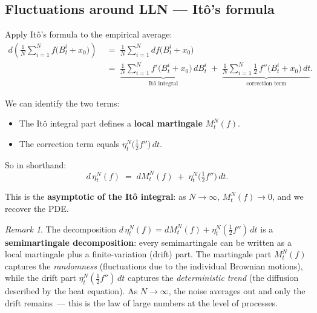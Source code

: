 \documentclass[11pt]{article}
\theoremstyle{definition}
\theoremstyle{remark}
\newtheorem{remark}{Remark}
\begin{document}
\subsection*{Fluctuations around LLN --- Itô's formula}


Apply Itô's formula to the empirical average:
\begin{align*}
    d\!\left(
        \frac{1}{N}\sum_{i=1}^{N}
        f\!\bigl(B_t^i + x_0\bigr)
    \right)
    &\;=\;
    \frac{1}{N}\sum_{i=1}^{N}
    df\!\bigl(B_t^i + x_0\bigr) \\[8pt]
    &\;=\;
    \underbrace{
        \frac{1}{N}\sum_{i=1}^{N}
        f'\!\bigl(B_t^i + x_0\bigr)\,dB_t^i
    }_{\text{Itô integral}}
    \;+\;
    \underbrace{
        \frac{1}{N}\sum_{i=1}^{N}
        \frac{1}{2}\,f''\!\bigl(B_t^i + x_0\bigr)\,dt
    }_{\text{correction term}}.
\end{align*}


We can identify the two terms:
\begin{itemize}
    \item The Itô integral part defines a \textbf{local martingale}
          $M_t^N(f)$.
    \item The correction term equals
          $\eta_t^N\!\bigl(\tfrac{1}{2}f''\bigr)\,dt$.
\end{itemize}

So in shorthand:
\[
    d\,\eta_t^N(f)
    \;=\;
    dM_t^N(f)
    \;+\;
    \eta_t^N\!\bigl(\tfrac{1}{2}f''\bigr)\,dt.
\]


This is the \textbf{asymptotic of the Itô integral}:
as $N \to \infty$, $M_t^N(f) \to 0$, and we recover the PDE.

\begin{remark}
The decomposition $d\,\eta_t^N(f) = dM_t^N(f) + \eta_t^N(\tfrac{1}{2}f'')\,dt$
is a \textbf{semimartingale decomposition}: every semimartingale can
be written as a local martingale plus a finite-variation (drift) part.
The martingale part $M_t^N(f)$ captures the \emph{randomness}
(fluctuations due to the individual Brownian motions), while the
drift part $\eta_t^N(\tfrac{1}{2}f'')\,dt$ captures the
\emph{deterministic trend} (the diffusion described by the heat
equation).  As $N \to \infty$, the noise averages out and only the
drift remains~--- this is the law of large numbers at the level of
processes.
\end{remark}
\end{document}
